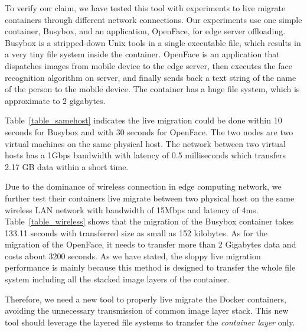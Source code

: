 To verify our claim, we have tested this tool with experiments to live migrate containers through different network connections. Our experiments use one simple container, Busybox, and an application, OpenFace, for edge server offloading.  Busybox is a stripped-down Unix tools in a single executable file, which results in a very tiny file system inside the container. OpenFace\cite{openface2016} is an application that dispatches images from mobile device to the edge server, then executes the face recognition algorithm on server, and finally sends back a text string of the name of the person to the mobile device. The container has a huge file system, which is approximate to $2$ gigabytes.

Table~\ref{table_samehost} indicates the live migration could be done within 10 seconds for Busybox and with 30 seconds for OpenFace. The two nodes are two virtual machines on the same physical host. The network between two virtual hosts has a 1Gbps bandwidth with latency of 0.5 milliseconds which transfers 2.17 GB data within a short time.


Due to the dominance of wireless connection in edge computing network, we further test their containers live migrate  between two physical host on the same wireless LAN network with bandwidth of 15Mbps and latency of 4ms. Table~\ref{table_wireless} shows that the migration of the Busybox container takes 133.11 seconds with transferred size as small as 152 kilobytes. As for the migration of the OpenFace, it needs to transfer more than 2 Gigabytes data and  costs about 3200 seconds. 
As we have stated, the sloppy live migration performance is mainly because this method is designed to transfer the whole file system including all the stacked image layers of the container. 

Therefore, we need a new tool to properly live migrate the Docker containers, avoiding the unnecessary transmission of common image layer stack.   
This new tool should leverage the layered file systems to  transfer the \textit{container layer} only.

